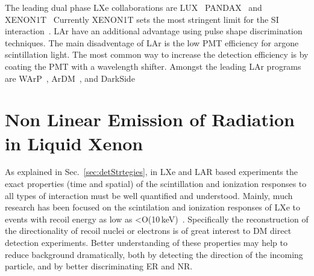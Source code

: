 The leading dual phase LXe collaborations are LUX~\cite{Akerib:2012ys} PANDAX~\cite{Cao:2014jsa} and XENON1T~\cite{Aprile:2017aty} Currently XENON1T sets the most stringent limit for the SI interaction~\cite{Xenon1TResults}. LAr have an additional advantage using  pulse shape discrimination techniques. The main disadventage of LAr is the low PMT efficiency for argone scintillation light. The most common way to increase the detection efficiency is by coating the PMT with a wavelength shifter. Amongst the leading LAr programs are WArP~\cite{Zani:2014lea}, ArDM~\cite{Rubbia:2005ge}, and DarkSide~\cite{Alexander:2013hia}  

\section{Non Linear Emission of Radiation in Liquid Xenon}
\label{sec:intro_superradiance}
As explained in Sec.~\ref{sec:detStrtegies}, in LXe and LAR based experiments the exact properties (time and spatial) of the scintillation and ionization responses to all types of interaction must be well quantified and understood. Mainly, much research has been focused on the scintilation and ionization responses of LXe to events with recoil energy as low as <O(10\,keV)~\cite{Manzur:2009hp,Aprile:2012an,Baudis:2013cca,Akerib:2016mzi}.
Specifically the reconstruction of the directionality of recoil nuclei or electrons is of great interest to DM direct detection experiments. Better understanding of these properties may help to reduce background dramatically, both by detecting the direction of the incoming particle, and by better discriminating ER and NR. 

